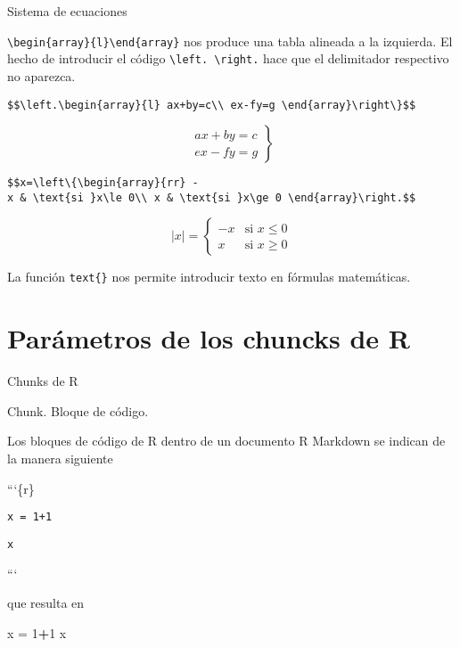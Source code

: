 \documentclass[ignorenonframetext,]{beamer}
\newenvironment{Shaded}{\begin{snugshade}}{\end{snugshade}}
\newcommand{\DecValTok}[1]{\textcolor[rgb]{0.00,0.00,0.81}{#1}}
\newcommand{\NormalTok}[1]{#1}
\newcommand{\OperatorTok}[1]{\textcolor[rgb]{0.81,0.36,0.00}{\textbf{#1}}}
\newcommand{\StringTok}[1]{\textcolor[rgb]{0.31,0.60,0.02}{#1}}
\begin{document}
\begin{frame}[fragile]{Sistema de ecuaciones}
\protect\hypertarget{sistema-de-ecuaciones}{}

\texttt{\textbackslash{}begin\{array\}\{l\}\textbackslash{}end\{array\}}
nos produce una tabla alineada a la izquierda. El hecho de introducir el
código \texttt{\textbackslash{}left.\ \textbackslash{}right.} hace que
el delimitador respectivo no aparezca.

\texttt{\$\$\textbackslash{}left.\textbackslash{}begin\{array\}\{l\}\ ax+by=c\textbackslash{}\textbackslash{}\ ex-fy=g\ \textbackslash{}end\{array\}\textbackslash{}right\textbackslash{}\}\$\$}

\[\left.\begin{array}{l}
ax+by=c\\
ex-fy=g
\end{array}\right\}\]

\texttt{\$\$\textbar{}x\textbar{}=\textbackslash{}left\textbackslash{}\{\textbackslash{}begin\{array\}\{rr\}\ -x\ \&\ \textbackslash{}text\{si\ \}x\textbackslash{}le\ 0\textbackslash{}\textbackslash{}\ x\ \&\ \textbackslash{}text\{si\ \}x\textbackslash{}ge\ 0\ \textbackslash{}end\{array\}\textbackslash{}right.\$\$}

\[|x|=\left\{\begin{array}{rr}
-x & \text{si }x\le 0\\
x & \text{si }x\ge 0
\end{array}\right.\]

La función \texttt{text\{\}} nos permite introducir texto en fórmulas
matemáticas.

\end{frame}

\hypertarget{parametros-de-los-chuncks-de-r}{%
\section{Parámetros de los chuncks de
R}\label{parametros-de-los-chuncks-de-r}}

\begin{frame}[fragile]{Chunks de R}
\protect\hypertarget{chunks-de-r}{}

Chunk. Bloque de código.

Los bloques de código de R dentro de un documento R Markdown se indican
de la manera siguiente

```\{r\}

\texttt{x\ =\ 1+1}

\texttt{x}

```

que resulta en

\begin{Shaded}
\begin{Highlighting}[]
\NormalTok{x =}\StringTok{ }\DecValTok{1}\OperatorTok{+}\DecValTok{1}
\NormalTok{x}
\end{Highlighting}
\end{Shaded}

\end{frame}
\end{document}
